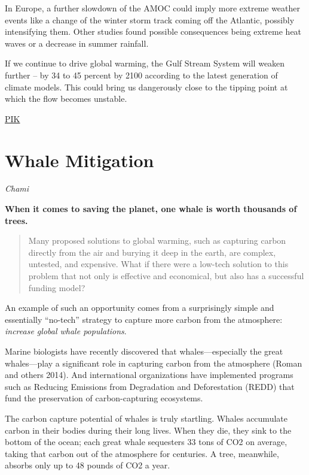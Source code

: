 \documentclass[
]{book}
\begin{document}
In Europe, a further slowdown of the AMOC could imply more extreme weather events like a change of the winter storm track coming off the Atlantic, possibly intensifying them. Other studies found possible consequences being extreme heat waves or a decrease in summer rainfall.

If we continue to drive global warming, the Gulf Stream System will weaken further -- by 34 to 45 percent by 2100 according to the latest generation of climate models.
This could bring us dangerously close to the tipping point at which the flow becomes unstable.

\href{https://www.pik-potsdam.de/en/news/latest-news/gulf-stream-system-at-its-weakest-in-over-a-millennium}{PIK}

\hypertarget{whale-mitigation}{%
\section{Whale Mitigation}\label{whale-mitigation}}

\emph{Chami}

\textbf{When it comes to saving the planet, one whale is worth thousands of trees.}

\begin{quote}
Many proposed solutions to global warming, such as capturing carbon directly from the air and burying it deep in the earth, are complex, untested, and expensive. What if there were a low-tech solution to this problem that not only is effective and economical, but also has a successful funding model?
\end{quote}

An example of such an opportunity comes from a surprisingly simple and essentially ``no-tech'' strategy to capture more carbon from the atmosphere: \emph{increase global whale populations}.

Marine biologists have recently discovered that whales---especially the great whales---play a significant role in capturing carbon from the atmosphere (Roman and others 2014). And international organizations have implemented programs such as Reducing Emissions from Degradation and Deforestation (REDD) that fund the preservation of carbon-capturing ecosystems.

The carbon capture potential of whales is truly startling. Whales accumulate carbon in their bodies during their long lives. When they die, they sink to the bottom of the ocean; each great whale sequesters 33 tons of CO2 on average, taking that carbon out of the atmosphere for centuries. A tree, meanwhile, absorbs only up to 48 pounds of CO2 a year.
\end{document}
